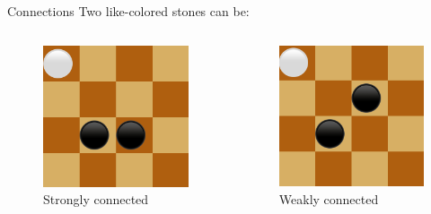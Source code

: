\documentclass{beamer}
\begin{document}
   \begin{frame}{Connections}
     Two like-colored stones can be:
     \vspace{0.5cm}
    \begin{columns}
			\begin{figure}
				\includegraphics[scale=0.35]{images/strong.png}
				\caption*{Strongly connected}
			\end{figure}
					
			\begin{figure}
				\includegraphics[scale=0.35]{images/weak.png}
				\caption*{Weakly connected}
			\end{figure}
		

\end{columns}
\end{frame}
\end{document}
